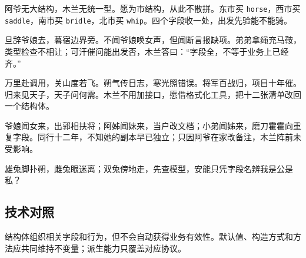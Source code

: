 阿爷无大结构，木兰无统一型。愿为市结构，从此不散拼。东市买 \texttt{horse}，西市买 \texttt{saddle}，南市买 \texttt{bridle}，北市买 \texttt{whip}。四个字段收一处，出发先验能不能骑。

旦辞爷娘去，暮宿边界旁。不闻爷娘唤女声，但闻断言报缺项。弟弟拿绳充马鞍，类型检查不相让；可汗催问能出发否，木兰答曰：“字段全，不等于业务上已经齐。”

万里赴调用，关山度若飞。朔气传日志，寒光照错误。将军百战归，项目十年催。归来见天子，天子问何需。木兰不用加接口，愿借格式化工具，把十二张清单改回一个结构体。

爷娘闻女来，出郭相扶将；阿姊闻妹来，当户改文档；小弟闻姊来，磨刀霍霍向重复字段。同行十二年，不知她的副本早已独立；只因阿爷在家改备注，木兰阵前未受影响。

雄兔脚扑朔，雌兔眼迷离；双兔傍地走，先查模型，安能只凭字段名辨我是公是私？

\subsection*{技术对照}

结构体组织相关字段和行为，但不会自动获得业务有效性。默认值、构造方式和方法应共同维持不变量；派生能力只覆盖对应协议。
